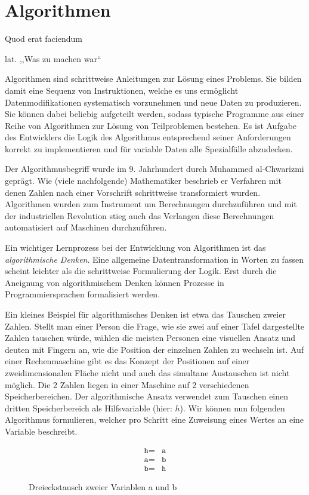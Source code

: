 \chapter{Algorithmen}
\epigraph{Quod erat faciendum}{lat. ,,Was zu machen war``}
%
Algorithmen sind schrittweise Anleitungen zur Lösung eines Problems. Sie bilden damit eine Sequenz von Instruktionen, welche es uns ermöglicht Datenmodifikationen systematisch vorzunehmen und neue Daten zu produzieren. Sie können dabei beliebig aufgeteilt werden, sodass typische Programme aus einer Reihe von Algorithmen zur Lösung von Teilproblemen bestehen. Es ist Aufgabe des Entwicklers die Logik des Algorithmus entsprechend seiner Anforderungen korrekt zu implementieren und für variable Daten alle Spezialfälle abzudecken.

Der Algorithmusbegriff wurde im 9. Jahrhundert durch Muhammed al-Chwarizmi geprägt. Wie (viele nachfolgende) Mathematiker beschrieb er Verfahren mit denen Zahlen nach einer Vorschrift schrittweise transformiert wurden. Algorithmen wurden zum Instrument um Berechnungen durchzuführen und mit der industriellen Revolution stieg auch das Verlangen diese Berechnungen automatisiert auf Maschinen durchzuführen.

Ein wichtiger Lernprozess bei der Entwicklung von Algorithmen ist das \emph{algorithmische Denken}. Eine allgemeine Datentransformation in Worten zu fassen scheint leichter als die schrittweise Formulierung der Logik. Erst durch die Aneignung von algorithmischem Denken können Prozesse in Programmiersprachen formalisiert werden.

Ein kleines Beispiel für algorithmisches Denken ist etwa das Tauschen zweier Zahlen. Stellt man einer Person die Frage, wie sie zwei auf einer Tafel dargestellte Zahlen tauschen würde, wählen die meisten Personen eine visuellen Ansatz und deuten mit Fingern an, wie die Position der einzelnen Zahlen zu wechseln ist. Auf einer Rechenmaschine gibt es das Konzept der Positionen auf einer zweidimensionalen Fläche nicht und auch das simultane Austauschen ist nicht möglich. Die 2 Zahlen liegen in einer Maschine auf 2 verschiedenen Speicherbereichen. Der algorithmische Ansatz verwendet zum Tauschen einen dritten Speicherbereich als Hilfsvariable (hier: $h$). Wir können nun folgenden Algorithmus formulieren, welcher pro Schritt eine Zuweisung eines Wertes an eine Variable beschreibt.
%
\begin{figure}[ht]
 \begin{center}
  \begin{align*}
  \texttt{h} \texttt{=} & \texttt{a} \\
  \texttt{a} \texttt{=} & \texttt{b} \\
  \texttt{b} \texttt{=} & \texttt{h}
  \end{align*}
  \caption{Dreieckstausch zweier Variablen a und b}
 \end{center}
\end{figure}

